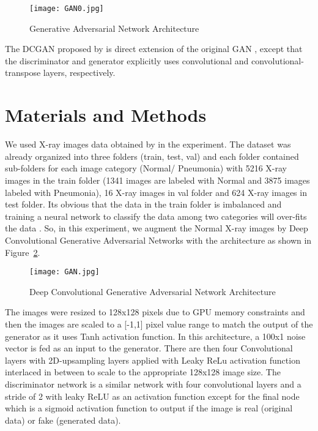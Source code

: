 \documentclass{article}
\begin{document}
\begin{figure}[htbp] \centering
\texttt{[image: GAN0.jpg]}
\caption{Generative Adversarial Network Architecture}
\label{fig:GAN}
\end{figure}

The DCGAN proposed by \cite{radford2015unsupervised} is direct extension of the original GAN \cite{goodfellow2014generative}, except that the discriminator and generator explicitly uses convolutional and convolutional-transpose layers, respectively.

\section*{Materials and Methods}

We used X-ray images data obtained by \cite{kermany2018identifying} in the experiment. The dataset was already organized into three folders (train, test, val) and each folder contained sub-folders for each image category (Normal/ Pneumonia) with 5216 X-ray images in the train folder (1341 images are labeled with Normal and 3875 images labeled with Pneumonia), 16 X-ray images in val folder and 624 X-ray images in test folder. Its obvious that the data in the train folder is imbalanced and training a neural network to classify the data among two categories will over-fits the data . So, in this experiment, we augment the Normal X-ray images by Deep Convolutional Generative Adversarial Networks with the architecture as shown in Figure~\ref{fig:DCGAN}.
\begin{figure}[htbp]
\centering
\texttt{[image: GAN.jpg]}
\caption{Deep Convolutional Generative Adversarial Network Architecture}
\label{fig:DCGAN}
\end{figure}
The images were resized to 128x128 pixels due to GPU memory constraints and then the images are scaled to a [-1,1] pixel value range to match the output of the generator as it uses Tanh activation function. In this architecture, a 100x1 noise vector is fed as an input to the generator. There are then four Convolutional layers with 2D-upsampling layers applied with Leaky ReLu activation function interlaced in between to scale to the appropriate 128x128 image size. The discriminator network is a similar network with four convolutional layers and a stride of 2 with leaky ReLU as an activation function except for the final node which is a sigmoid activation function to output if the image is real (original data) or fake (generated data). 
\end{document}
